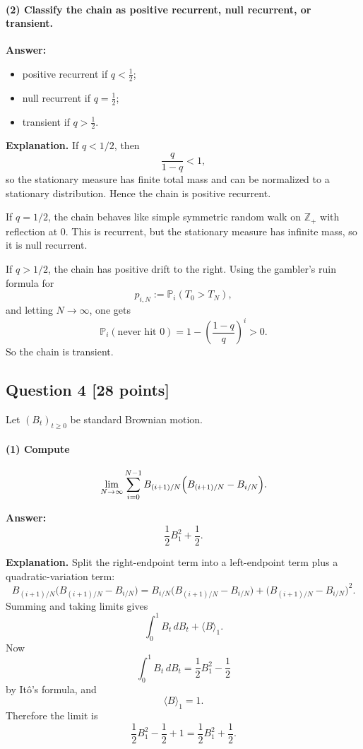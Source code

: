 \documentclass[11pt]{article}
\theoremstyle{definition}
\begin{document}
\paragraph{(2) Classify the chain as positive recurrent, null recurrent, or transient.}
\textbf{Answer:}
\begin{itemize}[leftmargin=2em]
    \item positive recurrent if $q<\frac12$;
    \item null recurrent if $q=\frac12$;
    \item transient if $q>\frac12$.
\end{itemize}

\textbf{Explanation.} If $q<1/2$, then
\[
\frac{q}{1-q}<1,
\]
so the stationary measure has finite total mass and can be normalized to a stationary distribution. Hence the chain is positive recurrent.

If $q=1/2$, the chain behaves like simple symmetric random walk on $\mathbb Z_+$ with reflection at $0$. This is recurrent, but the stationary measure has infinite mass, so it is null recurrent.

If $q>1/2$, the chain has positive drift to the right. Using the gambler's ruin formula for
\[
 p_{i,N}:=\mathbb P_i(T_0>T_N),
\]
and letting $N\to\infty$, one gets
\[
\mathbb P_i(\text{never hit }0)=1-\left(\frac{1-q}{q}\right)^i>0.
\]
So the chain is transient.

\subsection*{Question 4 \hfill [28 points]}
Let $(B_t)_{t\ge 0}$ be standard Brownian motion.

\paragraph{(1) Compute}
\[
\lim_{N\to\infty}\sum_{i=0}^{N-1} B_{(i+1)/N}\Bigl(B_{(i+1)/N}-B_{i/N}\Bigr).
\]

\textbf{Answer:}
\[
\frac12 B_1^2+\frac12.
\]

\textbf{Explanation.} Split the right-endpoint term into a left-endpoint term plus a quadratic-variation term:
\[
B_{(i+1)/N}\bigl(B_{(i+1)/N}-B_{i/N}\bigr)
=
B_{i/N}\bigl(B_{(i+1)/N}-B_{i/N}\bigr)
+
\bigl(B_{(i+1)/N}-B_{i/N}\bigr)^2.
\]
Summing and taking limits gives
\[
\int_0^1 B_t\,dB_t + \langle B\rangle_1.
\]
Now
\[
\int_0^1 B_t\,dB_t = \frac12 B_1^2 - \frac12
\]
by It\^o's formula, and
\[
\langle B\rangle_1=1.
\]
Therefore the limit is
\[
\frac12 B_1^2 - \frac12 + 1 = \frac12 B_1^2+\frac12.
\]
\end{document}
